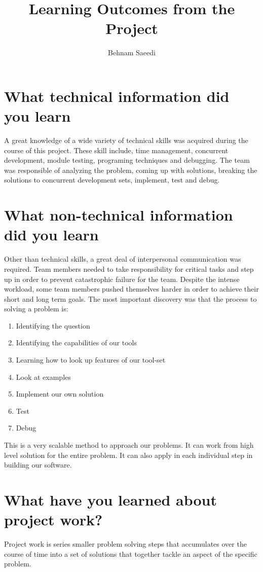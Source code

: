 \documentclass[journal,10pt,onecolumn,compsoc]{IEEEtran}
\title{Learning Outcomes from the Project}
\author{Behnam Saeedi}
\begin{document}
\maketitle
\section{What technical information did you learn}
\noindent A great knowledge of a wide variety of technical skills was acquired during the course of this project. These skill include, time management, concurrent development, module testing, programing techniques and debugging. The team was responsible of analyzing the problem, coming up with solutions, breaking the solutions to concurrent development sets, implement, test and debug.

\section{What non-technical information did you learn}
\noindent Other than technical skills, a great deal of interpersonal communication was required. Team members needed to take responsibility for critical tasks and step up in order to prevent catastrophic failure for the team. Despite the intense workload, some team members pushed themselves harder in order to achieve their short and long term goals. The most important discovery was that the process to solving a problem is:
\begin{enumerate}
\item Identifying the question
\item Identifying the capabilities of our tools
\item Learning how to look up features of our tool-set
\item Look at examples
\item Implement our own solution
\item Test
\item Debug
\end{enumerate}
\noindent This is a very scalable method to approach our problems. It can work from high level solution for the entire problem. It can also apply in each individual step in building our software.

\section{What have you learned about project work?}
\noindent Project work is series smaller problem solving steps that accumulates over the course of time into a set of solutions that together tackle an aspect of the specific problem.
\end{document}
